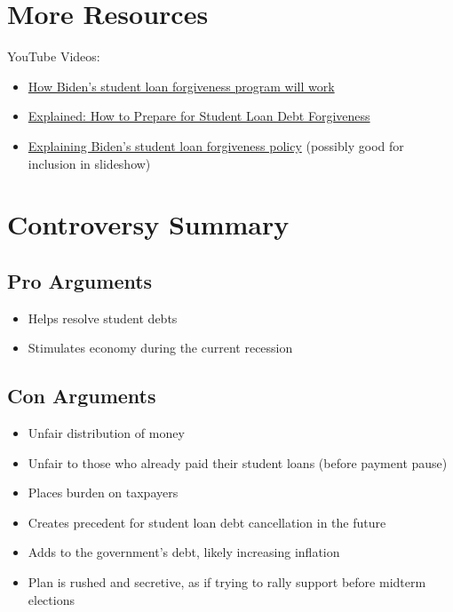 \documentclass{../khw}
\begin{document}
\section{More Resources}

YouTube Videos:
\begin{itemize}
    \item \href{https://www.youtube.com/watch?v=--ixiTypG8g}
        {How Biden's student loan forgiveness program will work}
    \item \href{https://www.youtube.com/watch?v=-uhxsF1mhv8}
        {Explained: How to Prepare for Student Loan Debt Forgiveness}
    \item \href{https://www.youtube.com/watch?v=BtCwtuc63Hw}
        {Explaining Biden's student loan forgiveness policy}
        (possibly good for inclusion in slideshow)
\end{itemize}

\section{Controversy Summary}

\subsection{Pro Arguments}
\begin{itemize}
    \item Helps resolve student debts
    \item Stimulates economy during the current recession
\end{itemize}

\subsection{Con Arguments}
\begin{itemize}
    \item Unfair distribution of money
    \item Unfair to those who already paid their student loans (before payment pause)
    \item Places burden on taxpayers
    \item Creates precedent for student loan debt cancellation in the future
    \item Adds to the government's debt, likely increasing inflation
    \item Plan is rushed and secretive, as if trying to rally support before midterm elections
\end{itemize}
\end{document}
